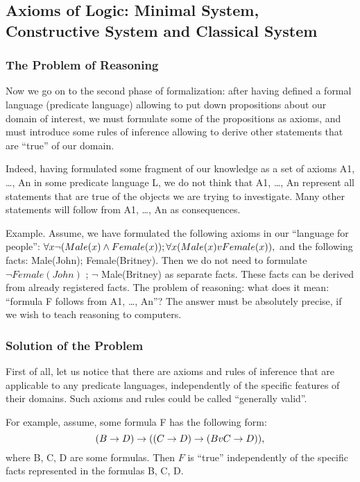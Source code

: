 \subsection{Axioms of Logic: Minimal System, Constructive System and Classical System}

\subsubsection*{The Problem of Reasoning}

Now we go on to the second phase of formalization: after having defined a formal language (predicate language) allowing to put down propositions about our domain of interest, we must formulate some of the propositions as axioms, and must introduce some rules of inference allowing to derive other statements that are ``true'' of our domain.

Indeed, having formulated some fragment of our knowledge as a set of axioms A1, \ldots , An in some
predicate language L, we do not think that A1, \ldots , An represent all statements that are true of the objects
we are trying to investigate. Many other statements will follow from A1, \ldots , An as consequences.

Example. Assume, we have formulated the following axioms in our ``language for people'':
\(\forall x\neg (Male(x)\wedge Female(x)); \forall x(Male(x)vFemale(x)),\) and the following facts: Male(John);
Female(Britney). Then we do not need to formulate \(\neg Female(John)\) ; \(\neg\) Male(Britney) as separate facts.
These facts can be derived from already registered facts.
The problem of reasoning: what does it mean: ``formula F follows from A1, \ldots , An''? The answer must be
absolutely precise, if we wish to teach reasoning to computers.

\subsubsection*{Solution of the Problem}

First of all, let us notice that there are axioms and rules of inference that are applicable to any predicate
languages, independently of the specific features of their domains. Such axioms and rules could be called
``generally valid''.

For example, assume, some formula F has the following form:
\[
(B\rightarrow D)\rightarrow ((C\rightarrow D)\rightarrow (BvC\rightarrow D)),
\]
where B, C, D are some formulas.
Then \(F\) is ``true'' independently of the specific facts represented in the formulas B, C, D.

